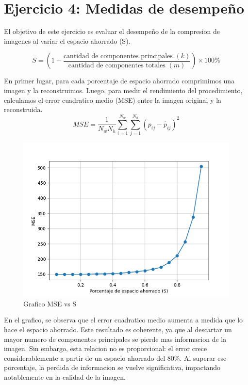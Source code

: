 \documentclass[a4paper,12pt]{article}
\numberwithin{equation}{section}
\numberwithin{figure}{section}
\begin{document}
\section{Ejercicio 4: Medidas de desempeño}
El objetivo de este ejercicio es evaluar el desempeño de la compresion de imagenes al variar el espacio ahorrado (S). 

\begin{equation}
S = \left( 1 - \frac{\text{cantidad de componentes principales } (k)}{\text{cantidad de componentes totales } (m)} \right) \times 100 \%
\end{equation}

En primer lugar, para cada porcentaje de espacio ahorrado comprimimos una imagen y la reconstruimos. Luego, para 
medir el rendimiento del procedimiento, calculamos el error cuadratico medio (MSE) entre la imagen original y 
la reconstruida. 
\begin{equation}
MSE = \frac{1}{N_w N_h} \sum_{i=1}^{N_w} \sum_{j=1}^{N_h} (p_{ij} - \hat{p}_{ij})^2
\end{equation}

\begin{figure}[H]
    \centering
    \includegraphics[width=1\textwidth]{Ejercicio 4a.png}
    \caption{Grafico MSE vs S}
    \label{fig:ej4}
\end{figure}

En el grafico, se observa que el error cuadratico medio aumenta a medida que lo hace el espacio ahorrado.
Este resultado es coherente, ya que al descartar un mayor numero de componentes principales se pierde mas 
informacion de la imagen. 
Sin embargo, esta relacion no es proporcional: el error crece considerablemente a partir de un espacio 
ahorrado del 80\%. Al superar ese porcentaje, la perdida de informacion se vuelve significativa, 
impactando notablemente en la calidad de la imagen. 
\end{document}
